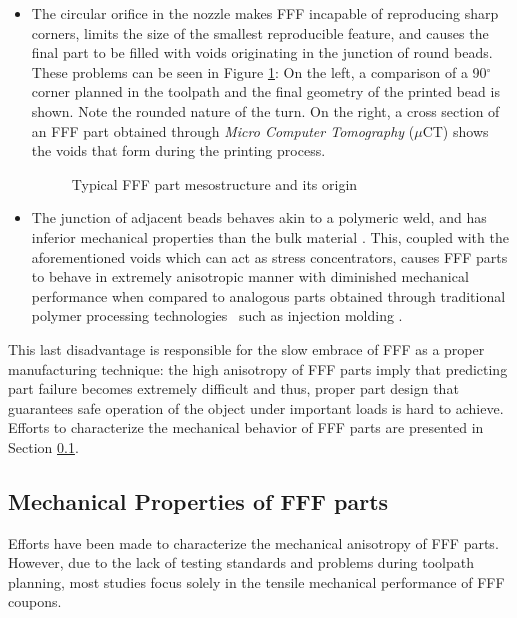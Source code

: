 \documentclass[main.tex]{subfiles}
\begin{document}
\begin{itemize}
	\item The circular orifice in the nozzle makes FFF incapable of reproducing sharp corners, limits the size of the smallest reproducible feature, and causes the final part to be filled with voids \textendash originating in the junction of round beads. These problems can be seen in Figure \ref{fig:FFFpartprob}: On the left, a comparison of a 90$^\circ$ corner planned in the toolpath and the final geometry of the printed bead is shown. Note the rounded nature of the turn. On the right, a cross section of an FFF part obtained through \emph{Micro Computer Tomography} ($\mu$CT) shows the voids that form during the printing process.
	\begin{figure}[h]
		\center
		\hfill
		\caption{Typical FFF part mesostructure and its origin} \label{fig:FFFpartprob}
	\end{figure}
	\item The junction of adjacent beads behaves akin to a polymeric weld, and has inferior mechanical properties than the bulk material \cite{Capote2017}. This, coupled with the aforementioned voids which can act as stress concentrators, causes FFF parts to behave in extremely anisotropic manner with diminished mechanical performance when compared to analogous parts obtained through traditional polymer processing technologies \textendash~such as injection molding \cite{Capote2017}.
\end{itemize}

This last disadvantage is responsible for the slow embrace of FFF as a proper manufacturing technique: the high anisotropy of FFF parts imply that predicting part failure becomes extremely difficult and thus, proper part design that guarantees safe operation of the object under important loads is hard to achieve.  Efforts to characterize the mechanical behavior of FFF parts are presented in Section \ref{ssec:mechPropFFF}.

\subsection{Mechanical Properties of FFF parts}\label{ssec:mechPropFFF}

Efforts have been made to characterize the mechanical anisotropy of FFF parts. However, due to the lack of testing standards and problems during toolpath planning, most studies focus solely in the tensile mechanical performance of FFF coupons.
\end{document}
